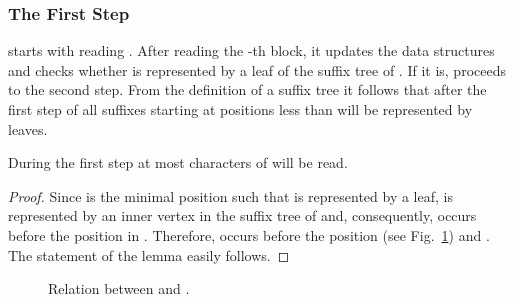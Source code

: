 \documentclass[10pt]{llncs}
\begin{document}
\subsubsection{The First Step}
 starts with reading . After reading the -th block, it updates the data structures and checks whether  is represented by a leaf of the suffix tree of . If it is,  proceeds to the second step. From the definition of a suffix tree it follows that after the first step of  all suffixes starting at positions less than  will be represented by leaves.

\begin{lemma}
\label{lm:prelim}
During the first step at most  characters of  will be read.
\end{lemma}
\begin{proof}
Since  is the minimal position such that  is represented by a leaf,  is represented by an inner vertex in the suffix tree of  and, consequently, occurs before the position  in . Therefore,  occurs before the position  (see Fig.~\ref{fig:LM2}) and . The statement of the lemma easily follows.
\end{proof}

\begin{figure}[h!]
    \begin{center}
             \caption{Relation between  and .}
      \label{fig:LM2}
    \end{center}
\end{figure}
\end{document}
